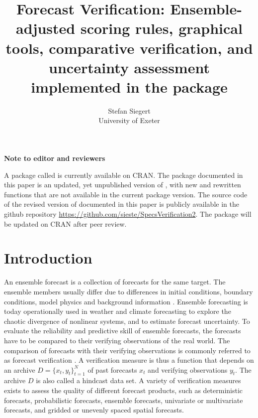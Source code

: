 \documentclass[article]{jss}\usepackage{graphicx, color}
\author{Stefan Siegert\\University of Exeter}
\title{Forecast Verification: Ensemble-adjusted scoring rules, graphical tools, comparative verification, and uncertainty assessment implemented in the \proglang{R} package \pkg{SpecsVerification}}
\begin{document}

\textbf{Note to editor and reviewers}

A package called  is currently available on CRAN.
The package documented in this paper is an updated, yet unpublished version of , with new and rewritten functions that are not available in the current package version.
The source code of the revised version of  documented in this paper is publicly available in the github repository \url{https://github.com/sieste/SpecsVerification2}.
The package will be updated on CRAN after peer review.


\section{Introduction}

An ensemble forecast is a collection of forecasts for the same target.
The ensemble members usually differ due to differences in initial conditions, boundary conditions, model physics and background information \citep{gneiting2005atmospheric, leutbecher2008ensemble}.
Ensemble forecasting is today operationally used in weather and climate forecasting to explore the chaotic divergence of nonlinear systems, and to estimate forecast uncertainty.
To evaluate the reliability and predictive skill of ensemble forecasts, the forecasts have to be compared to their verifying observations of the real world.
%
The comparison of forecasts with their verifying observations is commonly referred to as forecast verification \citep{jolliffe2012forecast}.
A verification measure is thus a function that depends on an archive $D=\{x_t, y_t\}_{t=1}^N$ of past forecasts $x_t$ and verifying observations $y_t$.
The archive $D$ is also called a hindcast data set.
A variety of verification measures exists to assess the quality of different forecast products, such as deterministic forecasts, probabilistic forecasts, ensemble forecasts, univariate or multivariate forecasts, and gridded or unevenly spaced spatial forecasts.
\end{document}
